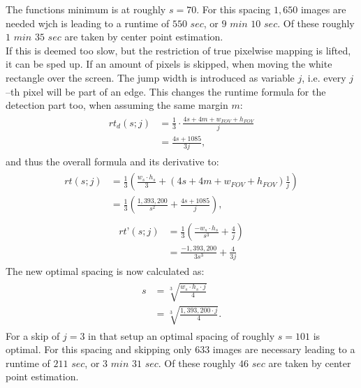 \documentclass[journal,final,a4paper,twoside]{PS}
\begin{document}
The functions minimum is at roughly $s = 70$. For this spacing $1,650$ images are needed wjch is leading to a runtime of $550$ $sec$, or $9$ $min$ $10$ $sec$. Of these roughly $1$ $min$ $35$ $sec$ are taken by center point estimation.\\
If this is deemed too slow, but the restriction of true pixelwise mapping is lifted, it can be sped up. If an amount of pixels is skipped, when moving the white rectangle over the screen. The jump width is introduced as variable $j$, i.e. every $j$--th pixel will be part of an edge. This changes the runtime formula for the detection part too, when assuming the same margin $m$:
\begin{align}\begin{split}
rt_d (s; j) &=\frac{1}{3} \cdot \frac{4s + 4  m + w_{FOV} + h_{FOV}}{j}\\
 &= \frac{4s + 1085}{3j},\end{split}
\end{align}
and thus the overall formula and its derivative to:
\begin{align}\begin{split}
rt(s; j) &= \frac{1}{3} \left(\frac{w_s\cdot h_s}{3} + \left( 4s + 4m + w_{FOV} + h_{FOV}\right)\frac{1}{j}\right)\\ &=\frac{1}{3}\left( \frac{1,393,200}{s^2} + \frac{4s +1085}{j}\right),\end{split}
\end{align}
\begin{align}\begin{split}
rt’(s; j) &= \frac{1}{3} \left(\frac{-w_s \cdot h_s}{s^3} + \frac{4}{j}\right)\\& =\frac{-1,393,200 }{3s^3} + \frac{4}{3j} \end{split}
\end{align}
The new optimal spacing is now calculated as:
\begin{align}\begin{split}
s &= \sqrt[3]{\frac{w_s \cdot h_s \cdot j }{ 4}} \\&= \sqrt[3]{\frac{1,393,200 \cdot j} { 4}}.\end{split}
\end{align}
For a skip of $j = 3$ in that setup an optimal spacing of roughly $s = 101$ is optimal. For this spacing and skipping only $633$ images are necessary leading to a runtime of $211$ $sec$, or $3$ $min$ $31$ $sec$. Of these roughly $46$ $sec$ are taken by center point estimation.
\end{document}
